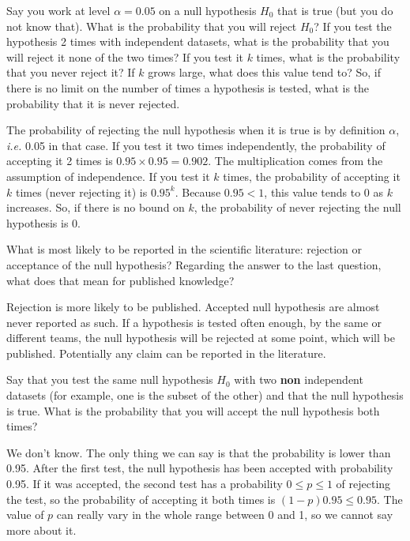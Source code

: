 \documentclass[a4paper]{article}
\theoremstyle{definition}
\begin{document}
\begin{Exercise}
Say you work at level $\alpha=0.05$ on a null hypothesis $H_0$
that is true (but you do not know that). What is the probability
that you will reject $H_0$? If you test the hypothesis 2
times with independent datasets, what is the probability that you
will reject it none of the two times? If you test it $k$ times, what is 
the probability that you never reject it? If $k$ grows large, what
does this value tend to? So, if there is no limit on the number
of times a hypothesis is tested, what is the probability that it is
never rejected.
\end{Exercise}
\begin{Answer}
The probability of rejecting the null hypothesis when it is true
is by definition $\alpha$, \textit{i.e.} 0.05 in that case. If
you test it two times independently, the probability of accepting
it 2 times is $0.95 \times 0.95 = 0.902$. The multiplication comes
from the assumption of independence. If you test it $k$
times, the probability of accepting it $k$ times (never rejecting
it) is $0.95^k$. Because $0.95 < 1$, this value tends to 0 as $k$
increases. So, if there is no bound on $k$, the probability
of never rejecting the null hypothesis is 0.
\end{Answer}

\begin{Exercise}
What is most likely to be reported in the scientific literature:
rejection or acceptance of the null hypothesis? Regarding the
answer to the last question, what does that mean for published
knowledge?
\end{Exercise}
\begin{Answer}
Rejection is more likely to be published.
Accepted null hypothesis are almost never
reported as such. If a hypothesis is tested often enough, by the
same or different teams, the null hypothesis will be rejected
at some point, which will be published. Potentially any claim can
be reported in the literature.
\end{Answer}

\begin{Exercise}
Say that you test the same null hypothesis $H_0$ with two \textbf{non}
independent datasets (for example, one is the subset of the other)
and that the null hypothesis is true. What is the probability that
you will accept the null hypothesis both times?
\end{Exercise}
\begin{Answer}
We don't know. The only thing we can say is that the probability is
lower than 0.95. After the first test, the null hypothesis has been
accepted with probability 0.95. If it was accepted, the second test
has a probability $0 \leq p \leq 1$ of rejecting the test, so the
probability of accepting it both times is $(1-p) 0.95 \leq 0.95$.
The value of $p$ can really vary in the whole range between 0 and
1, so we cannot say more about it.
\end{Answer}
\end{document}
